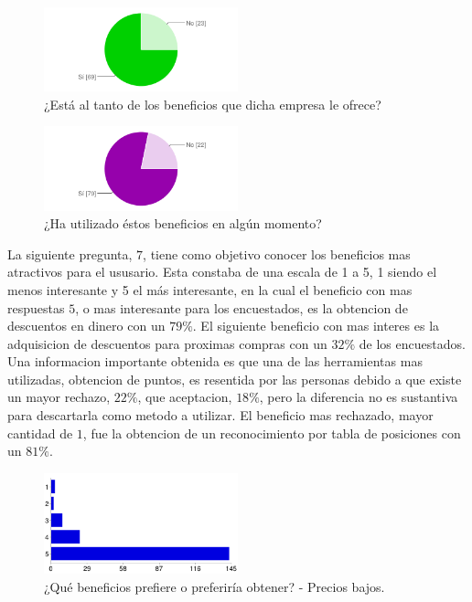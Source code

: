 \begin{figure}[!htb]
  \centering
  \includegraphics[width=0.5\textwidth]{images/chartPreg5.png}
  \caption[chart5]{¿Está al tanto de los beneficios que dicha empresa le ofrece?}
  \label{fig:chart2}
\end{figure}

   
\begin{figure}[!htb]
  \centering
  \includegraphics[width=0.5\textwidth]{images/chartPreg6.png}
  \caption[chart6]{¿Ha utilizado éstos beneficios en algún momento?}
  \label{fig:chart2}
\end{figure}

La siguiente pregunta, $7$, tiene como objetivo conocer los beneficios mas atractivos para el ususario. 
Esta constaba de una escala de 1 a 5, 1 siendo el menos interesante y 5 el más interesante, en la cual
el beneficio con mas respuestas $5$, o mas interesante para los encuestados, es la obtencion de 
descuentos en dinero con un $79\%$. El siguiente beneficio con mas interes es la adquisicion de descuentos 
para proximas compras con un $32\%$ de los encuestados. Una informacion importante obtenida es que 
una de las herramientas mas utilizadas, obtencion de puntos, es resentida por las personas debido a 
que existe un mayor rechazo, $22\%$, que aceptacion, $18\%$, pero la diferencia no es sustantiva para 
descartarla como metodo a utilizar. El beneficio mas rechazado, mayor cantidad de $1$, fue la 
obtencion de un reconocimiento por tabla de posiciones con un $81\%$.

\begin{figure}[!htb]
  \centering
  \includegraphics[width=0.5\textwidth]{images/chartPreg7_1.png}
  \caption[chart7-1]{¿Qué beneficios prefiere o preferiría obtener? - Precios bajos.}
  \label{fig:chart2}
\end{figure}

